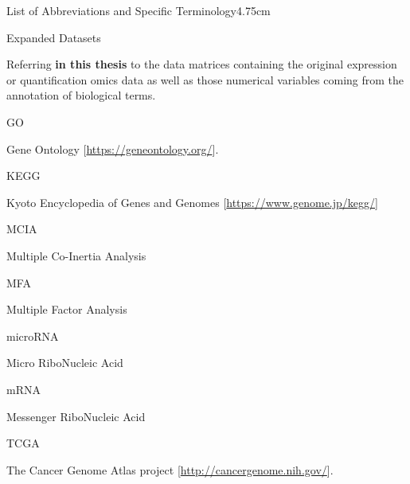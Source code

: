 \documentclass[a4paper, nobind]{templates/ociamthesis}
\begin{document}
\begin{romanpages}
\flushbottom

\tableofcontents

\listoffigures
	\mtcaddchapter

\listoftables
  \mtcaddchapter
\begin{mclistof}{List of Abbreviations and Specific Terminology}{4.75cm}

\item[Expanded Datasets]

Referring \textbf{in this thesis} to the data matrices containing the original expression or quantification omics data as well as those numerical variables coming from the annotation of biological terms.

\item[GO]

Gene Ontology {[}\url{https://geneontology.org/}{]}.

\item[KEGG]

Kyoto Encyclopedia of Genes and Genomes {[}\url{https://www.genome.jp/kegg/}{]}

\item[MCIA]

Multiple Co-Inertia Analysis

\item[MFA]

Multiple Factor Analysis

\item[microRNA]

Micro RiboNucleic Acid

\item[mRNA]

Messenger RiboNucleic Acid

\item[TCGA]

The Cancer Genome Atlas project {[}\url{http://cancergenome.nih.gov/}{]}.


\end{mclistof}
\end{romanpages}
\end{document}
